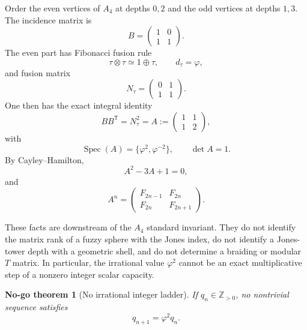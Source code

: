 \documentclass[aps,prd,preprint,nofootinbib,superscriptaddress]{revtex4-2}
\newtheorem{nogotheorem}[theorem]{No-go theorem}
\theoremstyle{definition}
\theoremstyle{remark}
\newcommand{\Spec}{\operatorname{Spec}}
\begin{document}
Order the even vertices of $A_4$ at depths $0,2$ and the odd vertices at depths $1,3$.  The incidence matrix is
\begin{equation}
B=
\begin{pmatrix}
1&0\\
1&1
\end{pmatrix}.
\label{eq:B}
\end{equation}
The even part has Fibonacci fusion rule
\begin{equation}
\tau\otimes\tau\simeq1\oplus\tau,
\qquad
d_\tau=\varphi,
\label{eq:fib-fusion}
\end{equation}
and fusion matrix
\begin{equation}
N_\tau=
\begin{pmatrix}
0&1\\
1&1
\end{pmatrix}.
\label{eq:Ntau}
\end{equation}
One then has the exact integral identity
\begin{equation}
BB^{\mathsf T}
=
N_\tau^2
=
A:=
\begin{pmatrix}
1&1\\
1&2
\end{pmatrix},
\label{eq:matrix-identity}
\end{equation}
with
\begin{equation}
\Spec(A)=\{\varphi^2,\varphi^{-2}\},
\qquad
\det A=1.
\label{eq:Aspec}
\end{equation}
By Cayley--Hamilton,
\begin{equation}
A^2-3A+1=0,
\end{equation}
and
\begin{equation}
A^n=
\begin{pmatrix}
F_{2n-1}&F_{2n}\\
F_{2n}&F_{2n+1}
\end{pmatrix}.
\label{eq:Apowers}
\end{equation}

These facts are downstream of the $A_4$ standard invariant.  They do not identify the matrix rank of a fuzzy sphere with the Jones index, do not identify a Jones-tower depth with a geometric shell, and do not determine a braiding or modular $T$ matrix.  In particular, the irrational value $\varphi^2$ cannot be an exact multiplicative step of a nonzero integer scalar capacity.

\begin{nogotheorem}[No irrational integer ladder]
If $q_n\in\mathbb Z_{>0}$, no nontrivial sequence satisfies
\begin{equation}
q_{n+1}=\varphi^2 q_n.
\end{equation}
\end{nogotheorem}
\end{document}
